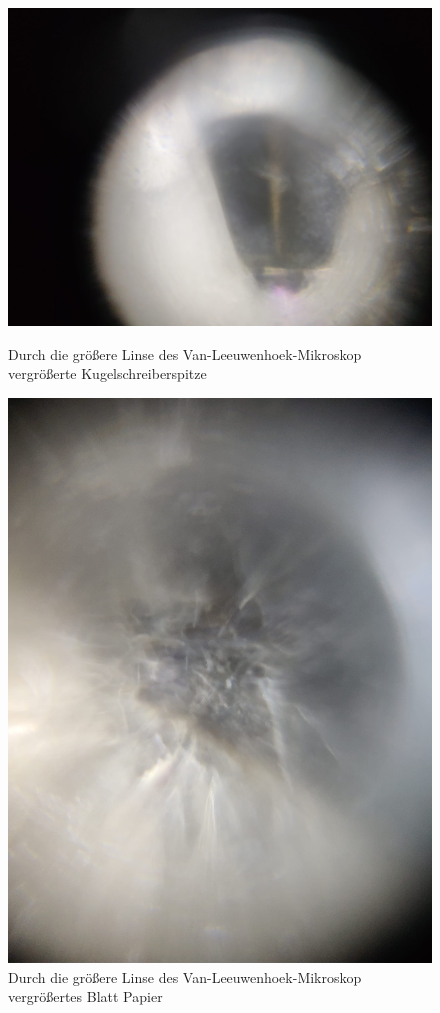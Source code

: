 \documentclass[ngerman]{scrartcl}
\begin{document}
\begin{figure}[H]
    \centering
    \begin{minipage}[b]{0.475\linewidth}
        \centering
        \includegraphics[width=\linewidth]{fig/Kulli.jpeg}
        \caption[Kugelschreiberspitze Van-Leeuwenhoek]{Durch die größere Linse des Van-Leeuwenhoek-Mikroskop vergrößerte Kugelschreiberspitze}
        \label{fig:vanleeuwenhoek_kugelschreiber}
    \end{minipage}%
    \hspace*{\fill}
    \begin{minipage}[t]{0.475\linewidth}
        \centering
        \includegraphics[width=0.75\linewidth]{fig/papier_gross.jpeg}
        \caption[Blatt Papier Van-Leeuwenhoek]{Durch die größere Linse des Van-Leeuwenhoek-Mikroskop vergrößertes Blatt Papier}
        \label{fig:vanleeuwenhoek_papier}
    \end{minipage}
\end{figure}
\end{document}
